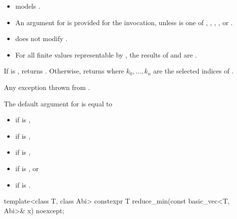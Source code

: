 \begin{itemdescr}
\pnum
\constraints
\begin{itemize}
\item
   models
  .
\item
  An argument for  is provided for the invocation,
  unless  is one of ,
  , , , or
  .
\end{itemize}

\pnum
\expects
\begin{itemize}
 \item
    does not modify .
 \item
   For all finite values  representable by , the results of
    and  are .
\end{itemize}

\pnum
\returns
If  is , returns .
Otherwise, returns  where $k_0, \ldots, k_n$ are
the selected indices of .

\pnum
\throws
Any exception thrown from .

\pnum
\remarks
The default argument for  is equal to
\begin{itemize}
\item {} if  is ,
\item {} if  is ,
\item {} if  is ,
\item {} if  is , or
\item {} if  is .
\end{itemize}
\end{itemdescr}

\begin{itemdecl}
template<class T, class Abi> constexpr T reduce_min(const basic_vec<T, Abi>& x) noexcept;
\end{itemdecl}

